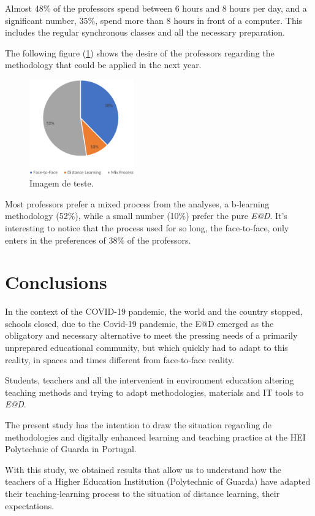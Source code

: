 \documentclass{textolivre}
\begin{document}
Almost 48\% of the professors spend between 6 hours and 8 hours per day, and a significant number, 35\%, spend more than 8 hours in front of a computer. This includes the regular synchronous classes and all the necessary preparation.

The following figure (\ref{fig7}) shows the desire of the professors regarding the methodology that could be applied in the next year. 

\begin{figure}[htbp]
 \centering
 \includegraphics[width=0.4\textwidth]{Fig_007.pdf}
 \caption{Imagem de teste.}
 \label{fig7}
\end{figure}

Most professors prefer a mixed process from the analyses, a b-learning methodology (52\%), while a small number (10\%) prefer the pure \emph{E@D}. It's interesting to notice that the process used for so long, the face-to-face, only enters in the preferences of 38\% of the professors.

\section{Conclusions}
In the context of the COVID-19 pandemic, the world and the country stopped, schools closed, due to the Covid-19 pandemic, the E@D emerged as the obligatory and necessary alternative to meet the pressing needs of a primarily unprepared educational community, but which quickly had to adapt to this reality, in spaces and times different from face-to-face reality. 

Students, teachers and all the intervenient in environment education altering teaching methods and trying to adapt methodologies, materials and IT tools to \emph{E@D}. 

The present study has the intention to draw the situation regarding de methodologies and digitally enhanced learning and teaching practice at the HEI Polytechnic of Guarda in Portugal.

With this study, we obtained results that allow us to understand how the teachers of a Higher Education Institution (Polytechnic of Guarda) have adapted their teaching-learning process to the situation of distance learning, their expectations.
\end{document}

